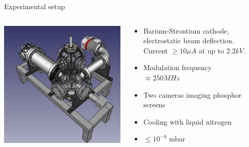 \documentclass[final]{beamer}
\begin{document}
\begin{frame}[fragile]{}
\begin{columns}[T]
\begin{column}{.49\linewidth}
    \end{column}


    \begin{column}{.49\linewidth}
      \begin{block}{\Large Experimental setup}
        \begin{columns}
          \begin{column}{0.4\columnwidth}
            \includegraphics[width=\columnwidth]{figures/cryoquak02.png}
          \end{column}
          \begin{column}{0.6\columnwidth}
              \begin{itemize}
                \item Barium-Strontium cathode, electrostatic beam deflection. Current $\geq 10 \mu A$ at
                    up to $2.2 kV$.
                \item Modulation frequency $\approx 250 MHz$
                \item Two cameras imaging phosphor screens
                \item Cooling with liquid nitrogen
                \item $\leq 10^{-8}$ mbar
              \end{itemize}
          \end{column}
        \end{columns}
      \end{block}


\end{column}
\end{columns}
\end{frame}
\end{document}
